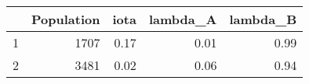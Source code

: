 \begin{tabular}{lrrrr}
\toprule
{} &  Population &  iota &  lambda\_A &  lambda\_B \\
\midrule
1 &        1707 &  0.17 &      0.01 &      0.99 \\
2 &        3481 &  0.02 &      0.06 &      0.94 \\
\bottomrule
\end{tabular}
